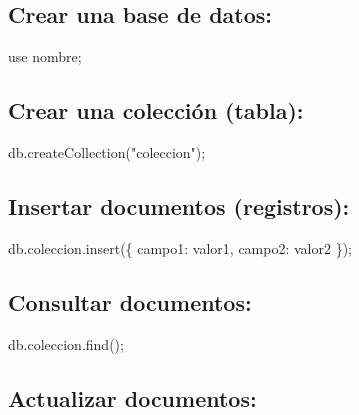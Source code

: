 \documentclass[
  a4paper,
  DIV=11,
  numbers=noendperiod,
  onepage,
  openany]{scrreprt}
\newenvironment{Shaded}{\begin{snugshade}}{\end{snugshade}}
\newcommand{\NormalTok}[1]{\textcolor[rgb]{0.00,0.23,0.31}{#1}}
\begin{document}
\hypertarget{crear-una-base-de-datos-3}{%
\subsection{Crear una base de datos:}\label{crear-una-base-de-datos-3}}

\begin{Shaded}
\begin{Highlighting}[]
\NormalTok{use nombre;}
\end{Highlighting}
\end{Shaded}

\hypertarget{crear-una-colecciuxf3n-tabla-1}{%
\subsection{Crear una colección
(tabla):}\label{crear-una-colecciuxf3n-tabla-1}}

\begin{Shaded}
\begin{Highlighting}[]
\NormalTok{db.createCollection("coleccion");}
\end{Highlighting}
\end{Shaded}

\hypertarget{insertar-documentos-registros-1}{%
\subsection{Insertar documentos
(registros):}\label{insertar-documentos-registros-1}}

\begin{Shaded}
\begin{Highlighting}[]
\NormalTok{db.coleccion.insert(\{ campo1: valor1, campo2: valor2 \});}
\end{Highlighting}
\end{Shaded}

\hypertarget{consultar-documentos-1}{%
\subsection{Consultar documentos:}\label{consultar-documentos-1}}

\begin{Shaded}
\begin{Highlighting}[]
\NormalTok{db.coleccion.find();}
\end{Highlighting}
\end{Shaded}

\hypertarget{actualizar-documentos-1}{%
\subsection{Actualizar documentos:}\label{actualizar-documentos-1}}
\end{document}
